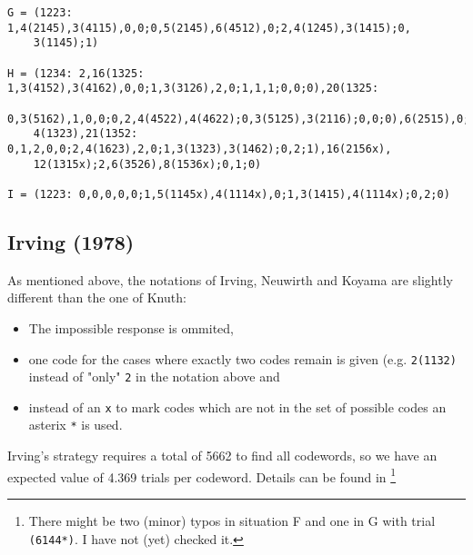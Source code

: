 \begin{verbatim}
G = (1223: 1,4(2145),3(4115),0,0;0,5(2145),6(4512),0;2,4(1245),3(1415);0,
    3(1145);1)

H = (1234: 2,16(1325: 1,3(4152),3(4162),0,0;1,3(3126),2,0;1,1,1;0,0;0),20(1325: 
    0,3(5162),1,0,0;0,2,4(4522),4(4622);0,3(5125),3(2116);0,0;0),6(2515),0;
    4(1323),21(1352: 0,1,2,0,0;2,4(1623),2,0;1,3(1323),3(1462);0,2;1),16(2156x),
    12(1315x);2,6(3526),8(1536x);0,1;0)

I = (1223: 0,0,0,0,0;1,5(1145x),4(1114x),0;1,3(1415),4(1114x);0,2;0)
\end{verbatim}
\normalsize

\subsection{Irving (1978)}
As mentioned above, the notations of Irving, Neuwirth and Koyama are slightly different than the one of Knuth:
\begin{itemize}
\item The impossible response  is ommited,
\item one code for the cases where exactly two codes remain is given (e.g. \texttt{2(1132)} instead of "only" \texttt{2} in the notation above and
\item instead of an \texttt{x} to mark codes which are not in the set of possible codes an asterix \texttt{*} is used.
\end{itemize}
Irving's strategy requires a total of 5662 to find all codewords, so we have an expected value of 4.369 trials per codeword.
Details can be found in \cite{IRVING78}\footnote{There might be two (minor) typos in situation F and one in G with trial {\scriptsize \texttt{(6144*)}}.
I have not (yet) checked it.}
\scriptsize
